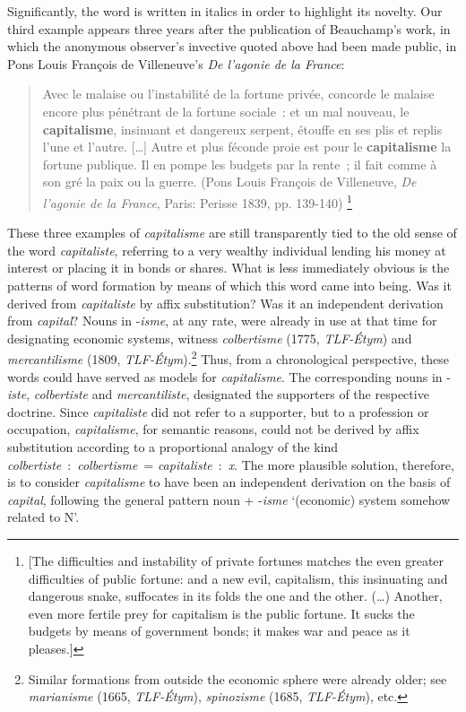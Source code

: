 \documentclass[output=paper]{langsci/langscibook}
\begin{document}
Significantly, the word is written in italics in order to highlight its
novelty. Our third example appears three years after the publication of
Beauchamp's work, in which the anonymous observer's invective quoted
above had been made public, in Pons Louis François de Villeneuve's
\emph{De l'agonie de la France}:

\begin{quote}
Avec le malaise ou l'instabilité de la fortune privée, concorde le
malaise encore plus pénétrant de la fortune sociale~: et un mal nouveau,
le \textbf{capitalisme}, insinuant et dangereux serpent, étouffe en ses
plis et replis l'une et l'autre. {[}\ldots{}{]} Autre et plus féconde
proie est pour le \textbf{capitalisme} la fortune publique. Il en pompe
les budgets par la rente~; il fait comme à son gré la paix ou la
guerre.
(Pons Louis François de Villeneuve,
\emph{De l'agonie de la France}, Paris: Perisse 1839, pp. 139-140)%
\footnote{{[}The difficulties and instability of private fortunes
  matches the even greater difficulties of public fortune: and a new
  evil, capitalism, this insinuating and dangerous snake, suffocates in
  its folds the one and the other. (\ldots{}) Another, even more fertile
  prey for capitalism is the public fortune. It sucks the budgets by
  means of government bonds; it makes war and peace as it pleases.{]}}
\end{quote}

These three examples of \emph{capitalisme} are still transparently tied
to the old sense of the word \emph{capitaliste}, referring to a very
wealthy individual lending his money at interest or placing it in bonds
or shares. What is less immediately obvious is the patterns of word formation 
by means of which  this word came into being. Was it derived from
\emph{capitaliste} by affix substitution? Was it an independent
derivation from \emph{capital}? Nouns in -\emph{isme}, at any rate, were
already in use at that time for designating economic systems, witness
\emph{colbertisme} (1775, \emph{TLF-Étym}) and \emph{mercantilisme}
(1809, \emph{TLF-Étym}).\footnote{Similar formations from outside the
  economic sphere were already older; see \emph{marianisme}
  (1665, \emph{TLF-Étym}), \emph{spinozisme} (1685, \emph{TLF-Étym}),
  etc.} Thus, from a chronological perspective, these words could have
served as models for \emph{capitalisme}. The corresponding nouns in
-\emph{iste}, \emph{colbertiste} and \emph{mercantiliste}, designated
the supporters of the respective doctrine. Since \emph{capitaliste} did
not refer to a supporter, but to a profession or occupation,
\emph{capitalisme}, for semantic reasons, could not be derived by affix
substitution according to a proportional analogy of the kind
\emph{colbertiste}~:~\emph{colbertisme}~= \emph{capitaliste}~:~\emph{x}.
The more plausible solution, therefore, is to consider \emph{capitalisme}
to have been an independent derivation on the basis of \emph{capital},
following the general pattern noun + -\emph{isme} `(economic) system
somehow related to N'.
\end{document}
